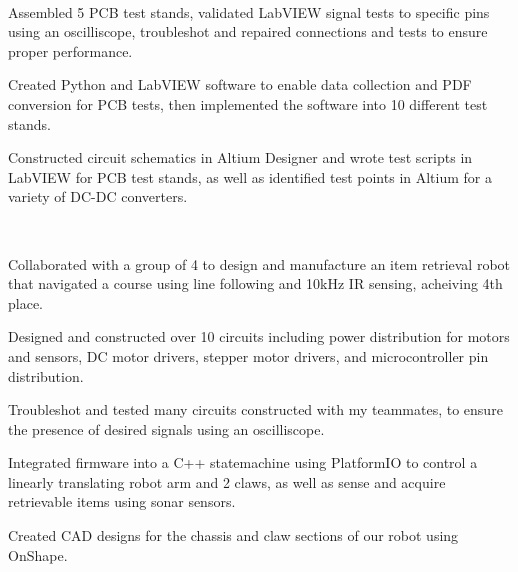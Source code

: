 \documentclass[a4paper]{MagicalCV}
\begin{document}
\begin{minipage}[t]{0.69\textwidth} 


 \\
\vspace{\topsep} %
\begin{tightemize}
\item Assembled 5 PCB test stands, validated LabVIEW signal tests to specific pins using an oscilliscope, troubleshot and repaired connections and tests to ensure proper performance.
\item Created Python and LabVIEW software to enable data collection and PDF conversion for PCB tests, then implemented the software into 10 different test stands. 
\item Constructed circuit schematics in Altium Designer and wrote test scripts in LabVIEW for PCB test stands, as well as identified test points in Altium for a variety of DC-DC converters.  
\end{tightemize}


 \\
\begin{tightemize}
    \item Collaborated with a group of 4 to design and manufacture an item retrieval robot that navigated a course using line following and 10kHz IR sensing, acheiving 4th place.
    \item Designed and constructed over 10 circuits including power distribution for motors and sensors, DC motor drivers, stepper motor drivers, and microcontroller pin distribution.
    \item Troubleshot and tested many circuits constructed with my teammates, to ensure the presence of desired signals using an oscilliscope.
    \item Integrated firmware into a C++ statemachine using PlatformIO to control a linearly translating robot arm and 2 claws, as well as sense and acquire retrievable items using sonar sensors. 
    \item Created CAD designs for the chassis and claw sections of our robot using OnShape.  
\end{tightemize}
\sectionsep


\end{minipage}
\end{document}
